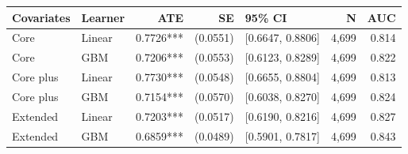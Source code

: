 \begin{tabular}{llrrlrr}
\toprule
Covariates & Learner & ATE & SE & 95\% CI & N & AUC \\
\midrule
Core & Linear & 0.7726*** & (0.0551) & [0.6647, 0.8806] & 4,699 & 0.814 \\
Core & GBM & 0.7206*** & (0.0553) & [0.6123, 0.8289] & 4,699 & 0.822 \\
Core plus & Linear & 0.7730*** & (0.0548) & [0.6655, 0.8804] & 4,699 & 0.813 \\
Core plus & GBM & 0.7154*** & (0.0570) & [0.6038, 0.8270] & 4,699 & 0.824 \\
Extended & Linear & 0.7203*** & (0.0517) & [0.6190, 0.8216] & 4,699 & 0.827 \\
Extended & GBM & 0.6859*** & (0.0489) & [0.5901, 0.7817] & 4,699 & 0.843 \\
\bottomrule
\end{tabular}
